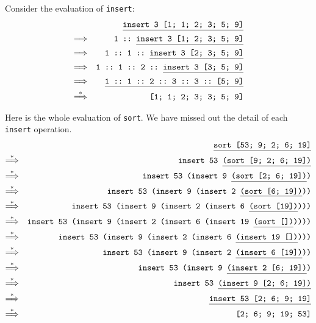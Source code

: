 \documentclass[]{book}
\begin{document}
\noindent Consider the evaluation of \texttt{insert\! [1; 1; 2; 3; 5; 9]}:
\begin{eqnarray*}
 & & \underline{\texttt{insert 3 [1; 1; 2; 3; 5; 9]\vphantom{g}}} \\
 \Longrightarrow & & \texttt{1 ::\ \underline{insert 3 [1; 2; 3; 5; 9]\vphantom{g}}} \\
 \Longrightarrow & & \texttt{1 ::\ 1 ::\ \underline{insert 3 [2; 3; 5; 9]\vphantom{g}}} \\
 \Longrightarrow & & \texttt{1 ::\ 1 ::\ 2 ::\ \underline{insert 3 [3; 5; 9]\vphantom{g}}} \\
 \Longrightarrow & & \texttt{\underline{1 ::\ 1 ::\ 2 ::\ 3 ::\ 3 ::\ [5; 9]\vphantom{g}}} \\
 \overset{*}\Longrightarrow & & \texttt{[1; 1; 2; 3; 3; 5; 9]}
\end{eqnarray*}

\noindent Here is the whole evaluation of \texttt{sort\! [53;\! 9;\! 2;\! 6;\! 19]}. We have missed out the detail of each \texttt{insert} operation.
\begin{eqnarray*}
 & & \underline{\texttt{sort [53; 9; 2; 6; 19]\vphantom{g}}} \\
 \overset{*}\Longrightarrow & & \texttt{insert 53 \underline{(sort [9; 2; 6; 19])\vphantom{g}}} \\
 \overset{*}\Longrightarrow & & \texttt{insert 53 (insert 9 \underline{\vphantom{g}(sort [2; 6; 19])})} \\
 \overset{*}\Longrightarrow & & \texttt{insert 53 (insert 9 (insert 2 \underline{(sort [6; 19])}))\vphantom{g}} \\
 \overset{*}\Longrightarrow & & \texttt{insert 53 (insert 9 (insert 2 (insert 6 \underline{(sort [19])\vphantom{g}})))} \\
 \overset{*}\Longrightarrow & & \texttt{insert 53 (insert 9 (insert 2 (insert 6 (insert 19 \underline{\vphantom{g}(sort [])}))))\vphantom{g}} \\
  \overset{*}\Longrightarrow & & \texttt{insert 53 (insert 9 (insert 2 (insert 6 \underline{\vphantom{g}(insert 19 [])})))} \\
 \overset{*}\Longrightarrow & & \texttt{insert 53 (insert 9 (insert 2 \underline{(insert 6 [19])\vphantom{g}}))} \\
 \overset{*}\Longrightarrow & & \texttt{insert 53 (insert 9 \underline{\vphantom{g}(insert 2 [6; 19])})} \\
 \overset{*}\Longrightarrow & & \texttt{insert 53 \underline{\vphantom{g}(insert 9 [2; 6; 19])}\vphantom{g}} \\
 \overset{*}\Longrightarrow & & \texttt{\underline{insert 53 [2; 6; 9; 19]\vphantom{g}}} \\
 \overset{*}\Longrightarrow & & \texttt{[2; 6; 9; 19; 53]}
\end{eqnarray*}
\end{document}
